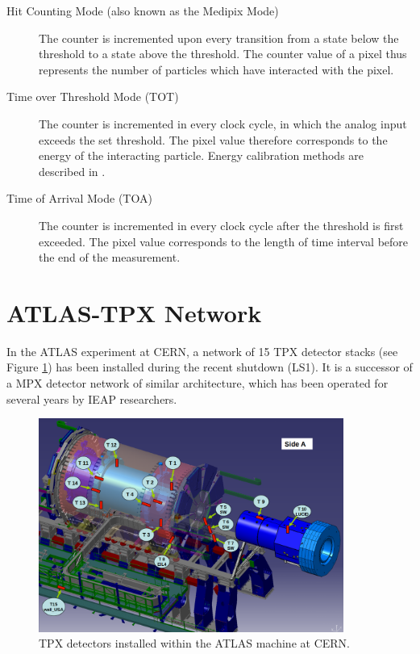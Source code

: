 \begin{description}
	\item[Hit Counting Mode (also known as the Medipix Mode)]
	The counter is incremented upon every transition from a state below the threshold to a state above the threshold. The counter value of a pixel thus represents the number of particles which have interacted with the pixel.

	\item[Time over Threshold Mode (TOT)]\label{tpx:tot}
	The counter is incremented in every clock cycle, in which the analog input exceeds the set threshold. The pixel value therefore corresponds to the energy of the interacting particle. Energy calibration methods are described in \cite{Jakubek2011S262}.

	\item[Time of Arrival Mode (TOA)]\label{tpx:toa}
	The counter is incremented in every clock cycle after the threshold is first exceeded. The pixel value corresponds to the length of time interval before the end of the measurement.
\end{description}

\section{ATLAS-TPX Network}
In the ATLAS experiment at CERN, a network of 15 TPX detector stacks (see Figure \ref{fig:tpx-positions-atlas}) has been installed during the recent shutdown (LS1). It is a successor of a MPX detector network of similar architecture, which has been operated for several years by IEAP researchers.

\begin{figure}[t]
\begin{center}
	\includegraphics[height=7cm]{figures/imported/tpx_positions}
\caption{TPX detectors installed within the ATLAS machine at CERN.}
\label{fig:tpx-positions-atlas}
\end{center}
\end{figure}

